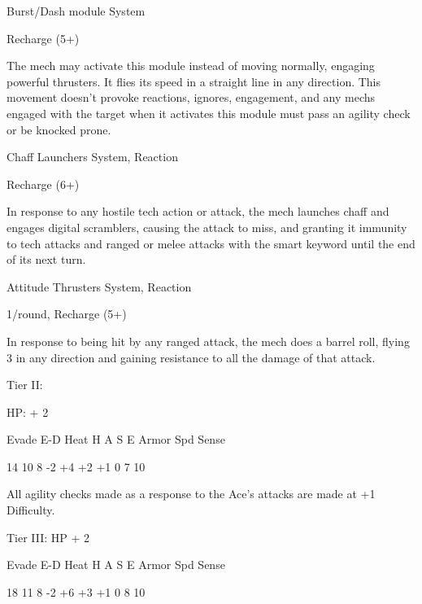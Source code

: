 Burst/Dash module
System

Recharge (5+)

The mech may activate this module instead of moving normally, engaging powerful thrusters. It
flies its speed in a straight line in any direction. This movement doesn’t provoke reactions,
ignores, engagement, and any mechs engaged with the target when it activates this module
must pass an agility check or be knocked prone.


Chaff Launchers
System, Reaction

Recharge (6+)

In response to any hostile tech action or attack, the mech launches chaff and engages digital
scramblers, causing the attack to miss, and granting it immunity to tech attacks and ranged or
melee attacks with the smart keyword until the end of its next turn.


Attitude Thrusters
System, Reaction

1/round, Recharge (5+)

In response to being hit by any ranged attack, the mech does a barrel roll, flying 3 in any
direction and gaining resistance to all the damage of that attack.


Tier II:

HP: + 2


          Evade    E-D    Heat    H     A     S    E        Armor       Spd       Sense

          14       10     8       -2    +4    +2   +1       0            7        10

All agility checks made as a response to the Ace’s attacks are made at +1 Difficulty.


Tier III:
HP + 2


          Evade    E-D    Heat    H     A     S    E        Armor       Spd       Sense

          18       11     8       -2    +6    +3   +1       0           8         10
